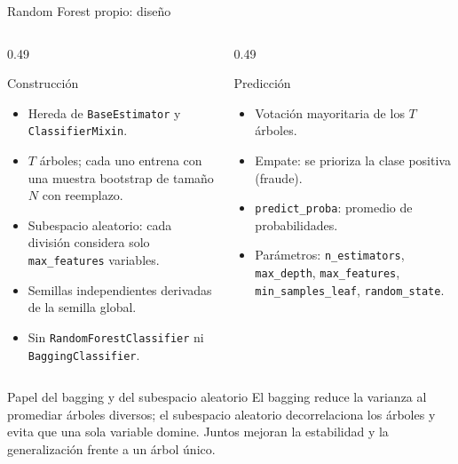 \documentclass[aspectratio=169,11pt]{beamer}
\begin{document}
\begin{frame}{Random Forest propio: diseño}
  \begin{columns}[T]
    \begin{column}{0.49\textwidth}
      \begin{block}{Construcción}
        \scriptsize
        \begin{itemize}
          \item Hereda de \texttt{BaseEstimator} y \texttt{ClassifierMixin}.
          \item \(T\) árboles; cada uno entrena con una muestra bootstrap
                de tamaño \(N\) con reemplazo.
          \item Subespacio aleatorio: cada división considera solo
                \texttt{max\_features} variables.
          \item Semillas independientes derivadas de la semilla global.
          \item Sin \texttt{RandomForestClassifier} ni
                \texttt{BaggingClassifier}.
        \end{itemize}
      \end{block}
    \end{column}
    \begin{column}{0.49\textwidth}
      \begin{block}{Predicción}
        \scriptsize
        \begin{itemize}
          \item Votación mayoritaria de los \(T\) árboles.
          \item Empate: se prioriza la clase positiva (fraude).
          \item \texttt{predict\_proba}: promedio de probabilidades.
          \item Parámetros: \texttt{n\_estimators}, \texttt{max\_depth},
                \texttt{max\_features}, \texttt{min\_samples\_leaf},
                \texttt{random\_state}.
        \end{itemize}
      \end{block}
    \end{column}
  \end{columns}

  \vspace{0.15cm}
  \begin{block}{Papel del bagging y del subespacio aleatorio}
    \small
    El bagging reduce la varianza al promediar árboles diversos; el
    subespacio aleatorio decorrelaciona los árboles y evita que una sola
    variable domine. Juntos mejoran la estabilidad y la generalización
    frente a un árbol único.
  \end{block}
\end{frame}
\end{document}
